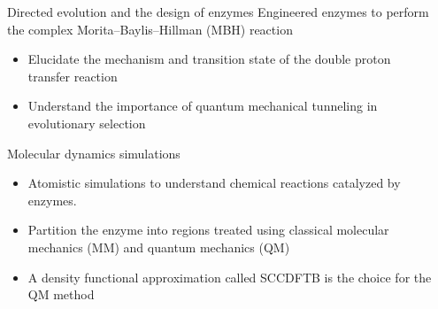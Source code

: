 \documentclass[final]{beamer}
\newlength{\sepwidth}
\newlength{\colwidth}
\newcommand{\separatorcolumn}{\begin{column}{\sepwidth}\end{column}}
\begin{document}
\begin{frame}[t]
\begin{columns}[t]
\separatorcolumn

\begin{column}{\colwidth}

\begin{block}{Directed evolution and the design of enzymes}
Engineered enzymes to perform the complex Morita–Baylis–Hillman (MBH) reaction \cite{Crawshaw22NatChem14p313} 
    \begin{itemize}
      \item Elucidate the mechanism and transition state of the double proton transfer reaction 
      \item Understand the importance of quantum mechanical tunneling in evolutionary selection
    \end{itemize}
 
  \end{block}

\begin{block}{Molecular dynamics simulations}
\begin{itemize}
\item Atomistic simulations to understand chemical reactions catalyzed by enzymes.
\item Partition the enzyme into regions treated using classical molecular mechanics (MM)
and quantum mechanics (QM)
\item A density functional approximation called SCCDFTB is the choice for the QM method
\end{itemize}


\end{block}
\end{column}
\end{columns}
\end{frame}
\end{document}
